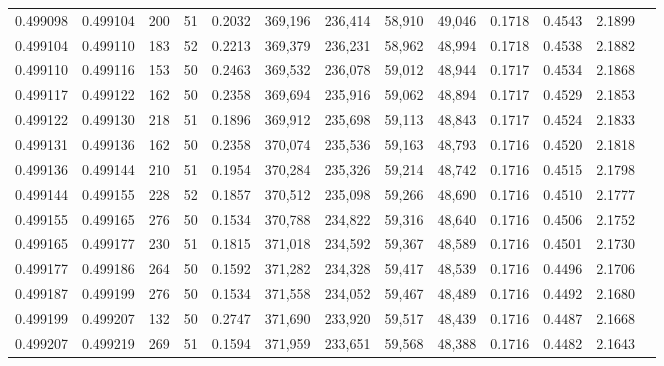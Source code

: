 \begin{tabular}{rrrrrrrrrrrrr}
0.499098 & 0.499104 & 200 &  51 &                                     0.2032 & 369,196 & 236,414 &  58,910 &  49,046 & 0.1718 & 0.4543 & 2.1899 \\
0.499104 & 0.499110 & 183 &  52 &                                     0.2213 & 369,379 & 236,231 &  58,962 &  48,994 & 0.1718 & 0.4538 & 2.1882 \\
0.499110 & 0.499116 & 153 &  50 &                                     0.2463 & 369,532 & 236,078 &  59,012 &  48,944 & 0.1717 & 0.4534 & 2.1868 \\
0.499117 & 0.499122 & 162 &  50 &                                     0.2358 & 369,694 & 235,916 &  59,062 &  48,894 & 0.1717 & 0.4529 & 2.1853 \\
0.499122 & 0.499130 & 218 &  51 &                                     0.1896 & 369,912 & 235,698 &  59,113 &  48,843 & 0.1717 & 0.4524 & 2.1833 \\
0.499131 & 0.499136 & 162 &  50 &                                     0.2358 & 370,074 & 235,536 &  59,163 &  48,793 & 0.1716 & 0.4520 & 2.1818 \\
0.499136 & 0.499144 & 210 &  51 &                                     0.1954 & 370,284 & 235,326 &  59,214 &  48,742 & 0.1716 & 0.4515 & 2.1798 \\
0.499144 & 0.499155 & 228 &  52 &                                     0.1857 & 370,512 & 235,098 &  59,266 &  48,690 & 0.1716 & 0.4510 & 2.1777 \\
0.499155 & 0.499165 & 276 &  50 &                                     0.1534 & 370,788 & 234,822 &  59,316 &  48,640 & 0.1716 & 0.4506 & 2.1752 \\
0.499165 & 0.499177 & 230 &  51 &                                     0.1815 & 371,018 & 234,592 &  59,367 &  48,589 & 0.1716 & 0.4501 & 2.1730 \\
0.499177 & 0.499186 & 264 &  50 &                                     0.1592 & 371,282 & 234,328 &  59,417 &  48,539 & 0.1716 & 0.4496 & 2.1706 \\
0.499187 & 0.499199 & 276 &  50 &                                     0.1534 & 371,558 & 234,052 &  59,467 &  48,489 & 0.1716 & 0.4492 & 2.1680 \\
0.499199 & 0.499207 & 132 &  50 &                                     0.2747 & 371,690 & 233,920 &  59,517 &  48,439 & 0.1716 & 0.4487 & 2.1668 \\
0.499207 & 0.499219 & 269 &  51 &                                     0.1594 & 371,959 & 233,651 &  59,568 &  48,388 & 0.1716 & 0.4482 & 2.1643 \\

\end{tabular}
